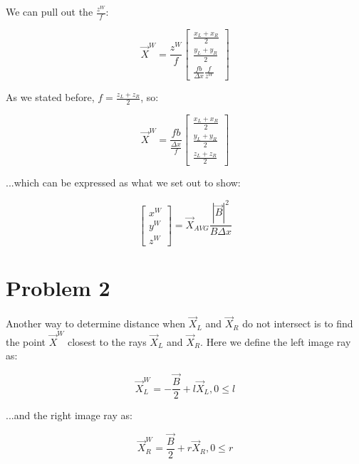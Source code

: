 \documentclass{article}
\begin{document}
\noindent We can pull out the $\frac{z^W}{f}$:

\begin{equation}
    \vec{X}^W = \frac{z^W}{f}\begin{bmatrix}
        \frac{x_L+x_R}{2} \\
        \frac{y_L+y_R}{2} \\
        \frac{fb}{\Delta x} \frac{f}{z^W}
    \end{bmatrix}
\end{equation}

\noindent As we stated before, $f = \frac{z_L+z_R}{2}$, so:

\begin{equation}
    \vec{X}^W = \frac{fb}{\frac{\Delta x}{f}}\begin{bmatrix}
        \frac{x_L+x_R}{2} \\
        \frac{y_L+y_R}{2} \\
        \frac{z_L+z_R}{2}
    \end{bmatrix}
\end{equation}

\noindent ...which can be expressed as what we set out to show:

\begin{equation}
    \begin{bmatrix}
        x^W \\ y^W \\ z^W
    \end{bmatrix} = \vec{X}_{AVG} \frac{|\vec{B}|^2}{B\Delta x}
\end{equation}

\section{Problem 2}

Another way to determine distance when $\vec{X}_L$ and $\vec{X}_R$ do not intersect is to find the point $\vec{X}^W$ closest to the rays $\vec{X}_L$ and $\vec{X}_R$. Here we define the left image ray as:

\begin{equation}
    \vec{X}_L^W = -\frac{\vec{B}}{2}+l\vec{X}_L,0\leq l
\end{equation}

\noindent ...and the right image ray as:

\begin{equation}
    \vec{X}_R^W = \frac{\vec{B}}{2}+r\vec{X}_R,0\leq r
\end{equation}
\end{document}
